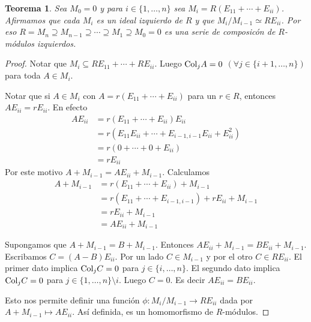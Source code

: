\documentclass{report}
\newcommand{\Col}{\textnormal{Col}}
\newtheorem{theorem}{Teorema}
\begin{document}
  \begin{theorem}
    Sea \(M_0 = 0\) y para \(i \in \{1, \dots, n\}\) sea \(M_i = R (E_{1 1} + \cdots + E_{i i})\).
    Afirmamos que cada \(M_i\) es un ideal izquierdo de \(R\) y que \(M_i / M_{i - 1} \simeq R E_{i i}\).
    Por eso \(R = M_n \supseteq M_{n - 1} \supseteq \cdots \supseteq M_1 \supseteq M_0 = 0\) es una serie de composicón de \(R\)-módulos izquierdos.
  \end{theorem}
  \begin{proof}
    Notar que \(M_i \subseteq R E_{1 1} + \cdots + R E_{i i}\).
    Luego \(\Col_j A = 0\) \((\forall j \in \{i + 1, \dots, n\})\) para toda \(A \in M_i\).

    Notar que si \(A \in M_i\) con \(A = r (E_{1 1} + \cdots + E_{i i})\) para un \(r \in R\), entonces \(A E_{i i} = r E_{i i}\).
    En efecto
    \begin{align}
      A E_{i i}
      &=
      r (E_{11} + \cdots + E_{i i}) E_{i i}
      \\
      &=
      r (E_{11} E_{i i} + \cdots + E_{i - 1, i - 1} E_{i i} + E_{i i}^2)
      \\
      &=
      r (0 + \cdots + 0 + E_{i i})
      \\
      &=
      r E_{i i}
    \end{align}
    Por este motivo \(A + M_{i - 1} = A E_{i i} + M_{i - 1}\).
    Calculamos
    \begin{align}
      A + M_{i - 1}
      &=
      r (E_{1 1} + \cdots + E_{i i}) + M_{i - 1}
      \\
      &=
      r(E_{1 1} + \cdots + E_{i - 1, i - 1}) + r E_{i i} + M_{i - 1}
      \\
      &=
      r E_{i i} + M_{i - 1}
      \\
      &=
      A E_{i i} + M_{i - 1}
    \end{align}

    Supongamos que \(A + M_{i - 1} = B + M_{i - 1}\).
    Entonces \(A E_{i i} + M_{i - 1} = B E_{i i} + M_{i - 1}\).
    Escribamos \(C = (A - B) E_{i i}\).
    Por un lado \(C \in M_{i - 1}\) y por el otro \(C \in R E_{i i}\).
    El primer dato implica \(\Col_j C = 0\) para \(j \in \{i, \dots, n\}\).
    El segundo dato implica \(\Col_j C = 0\) para \(j \in \{1, \dots, n\} \setminus i\).
    Luego \(C = 0\).
    Es decir \(A E_{i i} = B E_{i i}\).

    Esto nos permite definir una función \(\phi : M_i / M_{i - 1} \rightarrow R E_{i i}\) dada por \(A + M_{i - 1} \mapsto A E_{i i}\).
    Así definida, es un homomorfismo de \(R\)-módulos.


\end{proof}
\end{document}
